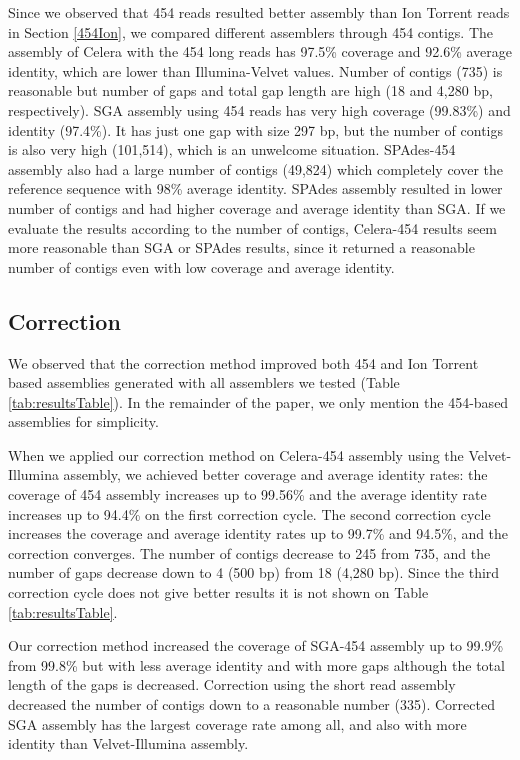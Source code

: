 \documentclass{llncs}
\begin{document}
Since we observed that 454 reads resulted better assembly than Ion Torrent reads in Section \ref{454Ion}, we compared different assemblers through 454 contigs. The assembly of Celera with the 454 long reads has 97.5\% coverage and 92.6\% average identity, which are lower than Illumina-Velvet values. Number of contigs (735) is reasonable but number of gaps and total gap length are high (18 and 4,280 bp, respectively). 
SGA assembly using 454 reads has very high coverage (99.83\%) and identity (97.4\%). It has just one gap with size 297 bp, but the number of contigs is also very high (101,514), which is an unwelcome situation. SPAdes-454 assembly also had a large number of contigs (49,824) which completely cover the reference sequence with 98\% average identity. SPAdes assembly resulted in lower number of contigs  and had higher coverage and average identity than SGA. 
If we evaluate the results according to the number of contigs, Celera-454 results seem more reasonable than SGA or SPAdes results, since it returned a reasonable number of contigs even with low coverage and average identity.

\subsection{Correction}

We observed that the correction method improved both 454 and Ion Torrent based assemblies generated with all assemblers we tested (Table \ref{tab:resultsTable}). In the remainder of the paper, we only mention the 454-based assemblies for simplicity.

When we applied our correction method on Celera-454 assembly using the Velvet-Illumina assembly, we achieved better coverage and average identity rates: the coverage of 454 assembly increases up to 99.56\% and the average identity rate increases up to 94.4\% on the first correction cycle. The second correction cycle increases the coverage and average identity rates up to 99.7\% and 94.5\%, and the correction converges. The number of contigs decrease to 245 from 735, and the number of gaps decrease down to 4 (500 bp) from 18 (4,280 bp). Since the third correction cycle does not give better results it is not shown on Table \ref{tab:resultsTable}.

Our correction method increased the coverage of SGA-454 assembly up to 99.9\% from 99.8\% but with less average identity and with more gaps although the total length of the gaps is decreased. Correction using the short read assembly decreased the number of contigs down to a reasonable number (335). Corrected SGA assembly has the largest coverage rate among all, and also with more identity than Velvet-Illumina assembly.
\end{document}
